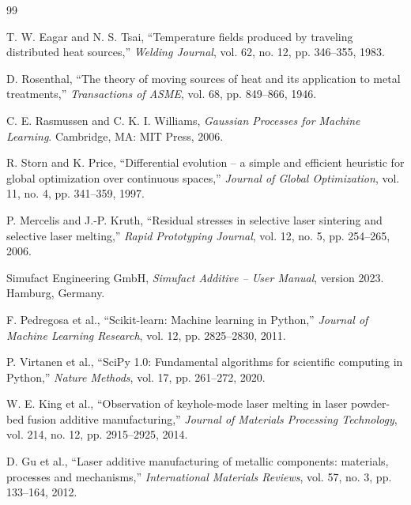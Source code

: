\documentclass[12pt,a4paper]{report}
\begin{document}
\begin{thebibliography}{99}

 T. W. Eagar and N. S. Tsai, ``Temperature fields produced by traveling distributed heat sources,'' \textit{Welding Journal}, vol. 62, no. 12, pp. 346--355, 1983.

 D. Rosenthal, ``The theory of moving sources of heat and its application to metal treatments,'' \textit{Transactions of ASME}, vol. 68, pp. 849--866, 1946.

 C. E. Rasmussen and C. K. I. Williams, \textit{Gaussian Processes for Machine Learning}. Cambridge, MA: MIT Press, 2006.

 R. Storn and K. Price, ``Differential evolution -- a simple and efficient heuristic for global optimization over continuous spaces,'' \textit{Journal of Global Optimization}, vol. 11, no. 4, pp. 341--359, 1997.

 P. Mercelis and J.-P. Kruth, ``Residual stresses in selective laser sintering and selective laser melting,'' \textit{Rapid Prototyping Journal}, vol. 12, no. 5, pp. 254--265, 2006.

 Simufact Engineering GmbH, \textit{Simufact Additive -- User Manual}, version 2023. Hamburg, Germany.

 F. Pedregosa et al., ``Scikit-learn: Machine learning in Python,'' \textit{Journal of Machine Learning Research}, vol. 12, pp. 2825--2830, 2011.

 P. Virtanen et al., ``SciPy 1.0: Fundamental algorithms for scientific computing in Python,'' \textit{Nature Methods}, vol. 17, pp. 261--272, 2020.

 W. E. King et al., ``Observation of keyhole-mode laser melting in laser powder-bed fusion additive manufacturing,'' \textit{Journal of Materials Processing Technology}, vol. 214, no. 12, pp. 2915--2925, 2014.

 D. Gu et al., ``Laser additive manufacturing of metallic components: materials, processes and mechanisms,'' \textit{International Materials Reviews}, vol. 57, no. 3, pp. 133--164, 2012.

\end{thebibliography}
\end{document}
